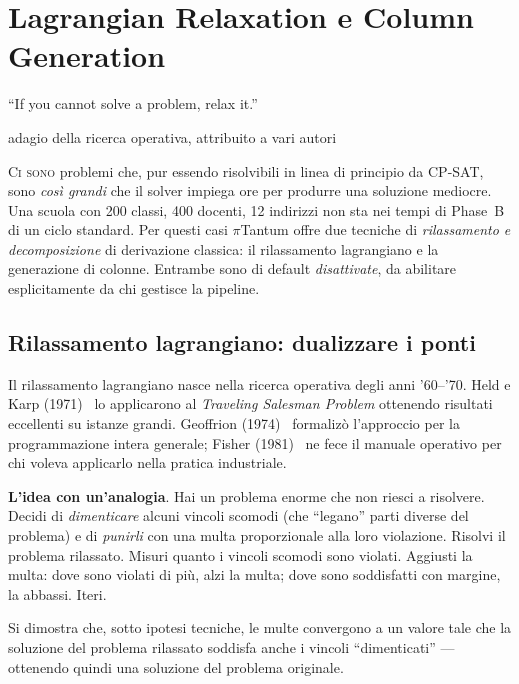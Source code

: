 \chapter{Lagrangian Relaxation e Column Generation}
\label{ch:metodo_lagrangian}

\epigraph{``If you cannot solve a problem, relax it.''}{adagio
della ricerca operativa, attribuito a vari autori}

\lettrine[lines=3]{C}{i sono} problemi che, pur essendo
risolvibili in linea di principio da CP-SAT, sono \emph{cos\`i
grandi} che il solver impiega ore per produrre una soluzione
mediocre. Una scuola con 200 classi, 400 docenti, 12 indirizzi
non sta nei tempi di Phase~B di un ciclo standard. Per questi
casi $\pi$Tantum offre due tecniche di \emph{rilassamento e
decomposizione} di derivazione classica: il rilassamento
lagrangiano e la generazione di colonne. Entrambe sono di
default \emph{disattivate}, da abilitare esplicitamente da
chi gestisce la pipeline.

\section{Rilassamento lagrangiano: dualizzare i ponti}

\begin{storiabox}
Il rilassamento lagrangiano nasce nella ricerca operativa
degli anni '60--'70. Held e Karp (1971)~\parencite{heldkarp1971}
lo applicarono al \emph{Traveling Salesman Problem} ottenendo
risultati eccellenti su istanze grandi. Geoffrion
(1974)~\parencite{geoffrion1974} formaliz\`o l'approccio per
la programmazione intera generale; Fisher
(1981)~\parencite{fisher1981} ne fece il manuale operativo
per chi voleva applicarlo nella pratica industriale.
\end{storiabox}

\begin{ideabox}
\textbf{L'idea con un'analogia}. Hai un problema enorme che
non riesci a risolvere. Decidi di \emph{dimenticare} alcuni
vincoli scomodi (che ``legano'' parti diverse del problema)
e di \emph{punirli} con una multa proporzionale alla loro
violazione. Risolvi il problema rilassato. Misuri quanto i
vincoli scomodi sono violati. Aggiusti la multa: dove sono
violati di pi\`u, alzi la multa; dove sono soddisfatti con
margine, la abbassi. Iteri.

Si dimostra che, sotto ipotesi tecniche, le multe convergono
a un valore tale che la soluzione del problema rilassato
soddisfa anche i vincoli ``dimenticati'' --- ottenendo
quindi una soluzione del problema originale.
\end{ideabox}

